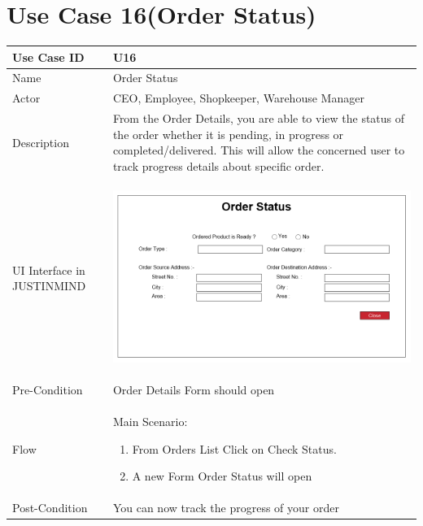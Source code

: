 \documentclass[12pt,a4paper]{report}
\begin{document}
\begin{tabular}{ | m{3cm} | m{12cm}| }
\end{tabular}
\section{Use Case 16(Order Status) }

\begin{tabular}{ | m{3cm} | m{12cm}| } \hline

Use Case ID &  U16 \\\hline

Name  	    &  Order Status \\ \hline

Actor     	&  CEO, Employee, Shopkeeper, Warehouse Manager \\ \hline

Description & From the Order Details, you are able to view the status of the order whether it is pending, in progress or completed/delivered. This will allow the concerned user to track progress details about specific order.   \\ \hline

UI Interface in JUSTINMIND & \begin{center} \includegraphics[scale=0.3]{./UIs for Latex Reports/UI-023 OrderStatus@1x.png}\end{center}  \\ \hline

Pre-Condition &  Order Details Form should open \\ \hline

Flow & Main Scenario:

\begin{enumerate}
\item   From Orders List Click on Check Status.
\item   A new Form Order Status will open
\end{enumerate}

\\ \hline
Post-Condition &  You can now track the progress of your order   \\ \hline

\end{tabular}
\end{document}
